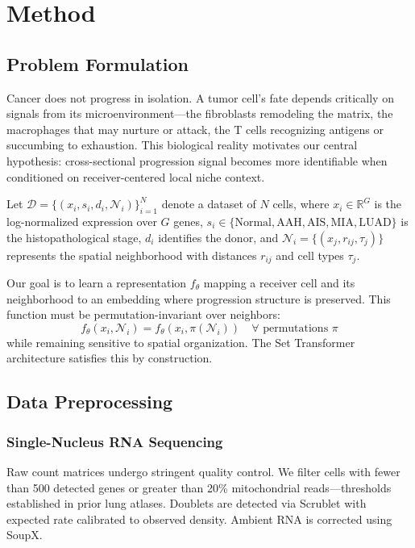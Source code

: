 \section{Method}

\subsection{Problem Formulation}

Cancer does not progress in isolation. A tumor cell's fate depends critically on signals from its microenvironment—the fibroblasts remodeling the matrix, the macrophages that may nurture or attack, the T cells recognizing antigens or succumbing to exhaustion. This biological reality motivates our central hypothesis: cross-sectional progression signal becomes more identifiable when conditioned on receiver-centered local niche context.

Let $\mathcal{D} = \{(x_i, s_i, d_i, \mathcal{N}_i)\}_{i=1}^{N}$ denote a dataset of $N$ cells, where $x_i \in \mathbb{R}^{G}$ is the log-normalized expression over $G$ genes, $s_i \in \{\text{Normal}, \text{AAH}, \text{AIS}, \text{MIA}, \text{LUAD}\}$ is the histopathological stage, $d_i$ identifies the donor, and $\mathcal{N}_i = \{(x_j, r_{ij}, \tau_j)\}$ represents the spatial neighborhood with distances $r_{ij}$ and cell types $\tau_j$.

Our goal is to learn a representation $f_\theta$ mapping a receiver cell and its neighborhood to an embedding where progression structure is preserved. This function must be permutation-invariant over neighbors:
\begin{equation}
    f_\theta(x_i, \mathcal{N}_i) = f_\theta(x_i, \pi(\mathcal{N}_i)) \quad \forall \text{ permutations } \pi
\end{equation}
while remaining sensitive to spatial organization. The Set Transformer architecture satisfies this by construction.

\subsection{Data Preprocessing}

\subsubsection{Single-Nucleus RNA Sequencing}

Raw count matrices undergo stringent quality control. We filter cells with fewer than 500 detected genes or greater than 20\% mitochondrial reads—thresholds established in prior lung atlases. Doublets are detected via Scrublet with expected rate calibrated to observed density. Ambient RNA is corrected using SoupX.

